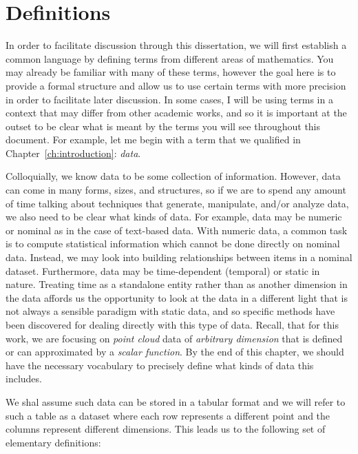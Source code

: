 
\chapter{Definitions}
\label{ch:definitions}

In order to facilitate discussion through this dissertation, we will first establish a common language by defining terms from different areas of mathematics.
%
You may already be familiar with many of these terms, however the goal here is to provide a formal structure and allow us to use certain terms with more precision in order to facilitate later discussion.
%
In some cases, I will be using terms in a context that may differ from other academic works, and so it is important at the outset to be clear what is meant by the terms you will see throughout this document.
%
For example, let me begin with a term that we qualified in Chapter~\ref{ch:introduction}: \emph{data}.

Colloquially, we know data to be some collection of information.
%
However, data can come in many forms, sizes, and structures, so if we are to spend any amount of time talking about techniques that generate, manipulate, and/or analyze data, we also need to be clear what kinds of data.
%
For example, data may be numeric or nominal as in the case of text-based data.
%
With numeric data, a common task is to compute statistical information which cannot be done directly on nominal data.
%
Instead, we may look into building relationships between items in a nominal dataset.
%
Furthermore, data may be time-dependent (temporal) or static in nature.
%
Treating time as a standalone entity rather than as another dimension in the data affords us the opportunity to look at the data in a different light that is not always a sensible paradigm with static data, and so specific methods have been discovered for dealing directly with this type of data.
%
Recall, that for this work, we are focusing on \emph{point cloud} data of \emph{arbitrary dimension} that is defined or can approximated by a \emph{scalar function}.
%
By the end of this chapter, we should have the necessary vocabulary to precisely define what kinds of data this includes.

We shal assume such data can be stored in a tabular format and we will refer to such a table as a dataset where each row represents a different point and the columns represent different dimensions. This leads us to the following set of elementary definitions:

